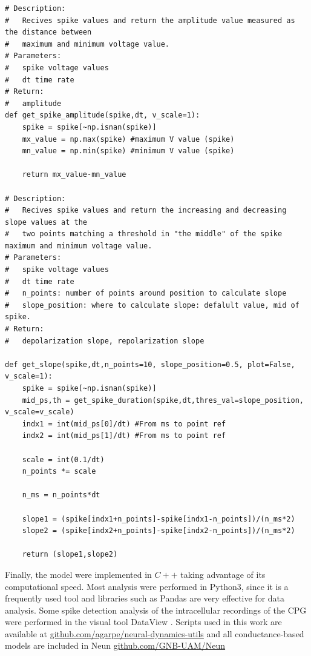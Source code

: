 \begin{lstlisting}
# Description: 
# 	Recives spike values and return the amplitude value measured as the distance between
#	maximum and minimum voltage value.
# Parameters:
# 	spike voltage values
# 	dt time rate
# Return:
#	amplitude
def get_spike_amplitude(spike,dt, v_scale=1):
	spike = spike[~np.isnan(spike)] 
	mx_value = np.max(spike) #maximum V value (spike)
	mn_value = np.min(spike) #minimum V value (spike)

	return mx_value-mn_value

# Description: 
# 	Recives spike values and return the increasing and decreasing slope values at the 
#	two points matching a threshold in "the middle" of the spike maximum and minimum voltage value.
# Parameters:
# 	spike voltage values
# 	dt time rate
# 	n_points: number of points around position to calculate slope
#   slope_position: where to calculate slope: defalult value, mid of spike.
# Return:
#	depolarization slope, repolarization slope 

def get_slope(spike,dt,n_points=10, slope_position=0.5, plot=False, v_scale=1):
	spike = spike[~np.isnan(spike)] 
	mid_ps,th = get_spike_duration(spike,dt,thres_val=slope_position, v_scale=v_scale)
	indx1 = int(mid_ps[0]/dt) #From ms to point ref
	indx2 = int(mid_ps[1]/dt) #From ms to point ref
	
	scale = int(0.1/dt)
	n_points *= scale
	
	n_ms = n_points*dt
	
	slope1 = (spike[indx1+n_points]-spike[indx1-n_points])/(n_ms*2) 
	slope2 = (spike[indx2+n_points]-spike[indx2-n_points])/(n_ms*2)

	return (slope1,slope2)
\end{lstlisting}

Finally, the model were implemented in $C++$ taking advantage of its computational speed. Most analysis were performed in Python3, since it is a frequently used tool and libraries such as Pandas are very effective for data analysis. Some spike detection analysis of the intracellular recordings of the CPG were performed in the visual tool DataView \parencite{heitler_dataview_2007}. Scripts used in this work are available at \href{https://github.com/agarpe/neural-dynamics-utils}{github.com/agarpe/neural-dynamics-utils} and all conductance-based models are included in Neun \href{https://github.com/GNB-UAM/Neun}{github.com/GNB-UAM/Neun}


